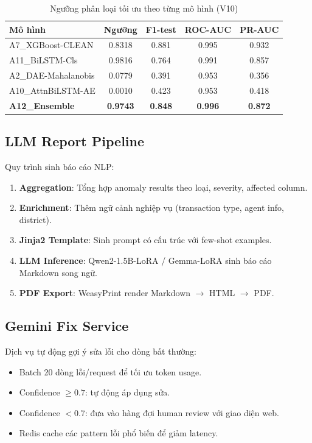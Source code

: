 \begin{table}[h!]
\centering
\fontsize{13pt}{14.95pt}\selectfont
\caption{Ngưỡng phân loại tối ưu theo từng mô hình (V10)}
\label{tab:threshold}
\begin{tabularx}{\textwidth}{|>{\raggedright\arraybackslash}X|c|c|c|c|}
\hline
\textbf{Mô hình} & \textbf{Ngưỡng} & \textbf{F1-test} & \textbf{ROC-AUC} & \textbf{PR-AUC} \\
\hline
A7\_XGBoost-CLEAN & 0.8318 & 0.881 & 0.995 & 0.932 \\
\hline
A11\_BiLSTM-Cls & 0.9816 & 0.764 & 0.991 & 0.857 \\
\hline
A2\_DAE-Mahalanobis & 0.0779 & 0.391 & 0.953 & 0.356 \\
\hline
A10\_AttnBiLSTM-AE & 0.0010 & 0.423 & 0.953 & 0.418 \\
\hline
\textbf{A12\_Ensemble} & \textbf{0.9743} & \textbf{0.848} & \textbf{0.996} & \textbf{0.872} \\
\hline
\end{tabularx}
\end{table}

\subsection{LLM Report Pipeline}

Quy trình sinh báo cáo NLP:

\begin{enumerate}
  \item \textbf{Aggregation}: Tổng hợp anomaly results theo loại, severity, affected column.
  \item \textbf{Enrichment}: Thêm ngữ cảnh nghiệp vụ (transaction type, agent info, district).
  \item \textbf{Jinja2 Template}: Sinh prompt có cấu trúc với few-shot examples.
  \item \textbf{LLM Inference}: Qwen2-1.5B-LoRA / Gemma-LoRA sinh báo cáo Markdown song ngữ.
  \item \textbf{PDF Export}: WeasyPrint render Markdown $\rightarrow$ HTML $\rightarrow$ PDF.
\end{enumerate}

\subsection{Gemini Fix Service}

Dịch vụ tự động gợi ý sửa lỗi cho dòng bất thường:
\begin{itemize}
  \item Batch 20 dòng lỗi/request để tối ưu token usage.
  \item Confidence $\geq 0.7$: tự động áp dụng sửa.
  \item Confidence $< 0.7$: đưa vào hàng đợi human review với giao diện web.
  \item Redis cache các pattern lỗi phổ biến để giảm latency.
\end{itemize}

